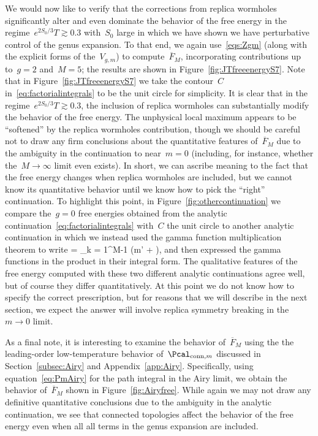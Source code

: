 \documentclass[12pt]{article}
\begin{document}
We would now like to verify that the corrections from replica wormholes significantly alter and even dominate the behavior of the free energy in the regime~$e^{2S_0/3} T \gtrsim 0.3$ with~$S_0$ large in which we have shown we have perturbative control of the genus expansion.  To that end, we again use~\eqref{eqs:Zgm} (along with the explicit forms of the~$V_{g,m}$) to compute~$\overline{F}_M$, incorporating contributions up to~$g = 2$ and~$M = 5$; the results are shown in Figure~\ref{fig:JTfreeenergyS7}.  Note that in Figure~\ref{fig:JTfreeenergyS7} we take the contour~$C$ in~\eqref{eq:factorialintegrals} to be the unit circle for simplicity.  It is clear that in the regime~$e^{2S_0/3} T \gtrsim 0.3$, the inclusion of replica wormholes can substantially modify the behavior of the free energy.  The unphysical local maximum appears to be ``softened'' by the replica wormholes contribution, though we should be careful not to draw any firm conclusions about the quantitative features of~$\overline{F}_M$ due to the ambiguity in the continuation to near~$m = 0$ (including, for instance, whether the~$M \to \infty$ limit even exists).  In short, we can ascribe meaning to the fact that the free energy changes when replica wormholes are included, but we cannot know its quantitative behavior until we know how to pick the ``right'' continuation.  To highlight this point, in Figure~\ref{fig:othercontinuation} we compare the~$g = 0$ free energies obtained from the analytic continuation~\eqref{eq:factorialintegrals} with~$C$ the unit circle to another analytic continuation in which we instead used the gamma function multiplication theorem to write
\be
\label{eq:gammamultiplication}
 =  \prod_{k = 1}^{M-1} \Gamma\left(m' + \right),
\ee
and then expressed the gamma functions in the product in their integral form.  The qualitative features of the free energy computed with these two different analytic continuations agree well, but of course they differ quantitatively.  At this point we do not know how to specify the correct prescription, but for reasons that we will describe in the next section, we expect the answer will involve replica symmetry breaking in the~$m \to 0$ limit.

As a final note, it is interesting to examine the behavior of~$\overline{F}_M$ using the the leading-order low-temperature behavior of~$\Pcal_{\mathrm{conn},m}$ discussed in Section~\ref{subsec:Airy} and Appendix~\ref{app:Airy}.  Specifically, using equation~\eqref{eq:PmAiry} for the path integral in the Airy limit, we obtain the behavior of~$\overline{F}_M$ shown in Figure~\ref{fig:Airyfree}.  While again we may not draw any definitive quantitative conclusions due to the ambiguity in the analytic continuation, we see that connected topologies affect the behavior of the free energy even when all all terms in the genus expansion are included.
\end{document}
